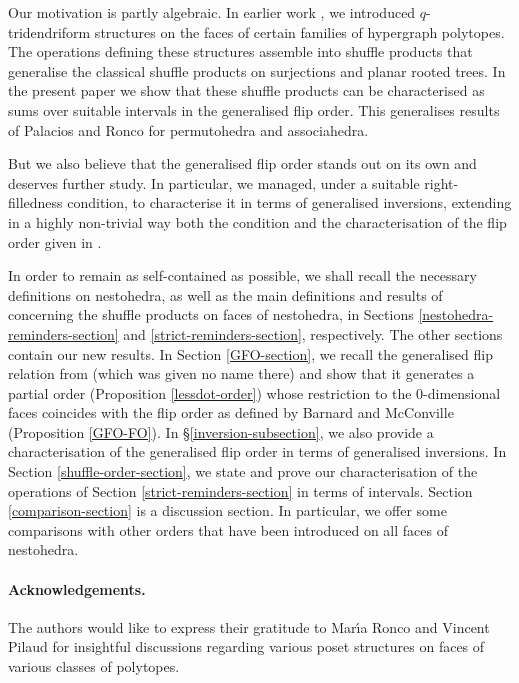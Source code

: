 \documentclass{article}
\theoremstyle{plain}
\theoremstyle{definition}
\begin{document}
\smallskip

Our motivation is partly algebraic. In earlier work \cite{PLBJ1}, we introduced $q$-tridendriform structures on the faces of certain families of 
hypergraph polytopes. The operations defining these structures assemble into shuffle products that generalise the classical shuffle products on surjections and planar rooted trees. In the present paper we show that these shuffle products can be characterised as sums over suitable intervals in the generalised flip order. This generalises results \cite{PalaciosRonco} of Palacios and Ronco for permutohedra and associahedra. 

\smallskip
But we also believe that the generalised flip order stands out on its own and deserves further study. In particular, we managed, under a suitable right-filledness condition, to characterise it in terms of generalised inversions, extending in a highly non-trivial way both the condition and the characterisation of the flip order given in \cite{BM}.

\medskip
 
In order to remain as self-contained as possible, we shall recall the necessary definitions on nestohedra, as well as the main definitions and results of \cite{PLBJ1} concerning the shuffle products on faces of nestohedra, in Sections \ref{nestohedra-reminders-section} and \ref{strict-reminders-section}, respectively.
The other sections contain our new results. In Section \ref{GFO-section}, we recall the generalised flip relation from \cite{CLA2} (which was given no name there) and show that it generates a partial order (Proposition \ref{lessdot-order}) whose restriction to the 0-dimensional faces coincides with the flip order as defined by Barnard and McConville (Proposition \ref{GFO-FO}). In \S \ref{inversion-subsection}, we also provide a characterisation of the generalised flip order in terms of generalised inversions. In Section \ref{shuffle-order-section}, we state and prove our characterisation of the operations of Section \ref{strict-reminders-section} in terms of intervals.
Section \ref{comparison-section} is a discussion section. In particular, we offer
 some comparisons with other orders that have been introduced on all faces of nestohedra.


\paragraph{Acknowledgements.}{{The authors would like to express their gratitude to Mar\'{\i}a Ronco and Vincent Pilaud for insightful discussions regarding various poset structures on faces of various classes of polytopes.}
}
\end{document}
